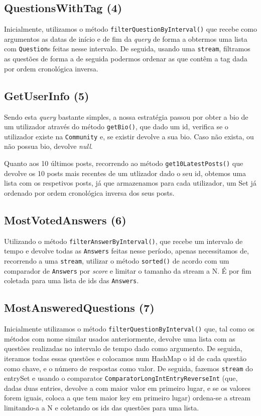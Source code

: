 \documentclass[a4paper]{article}
\begin{document}
	\subsection{QuestionsWithTag (4)}
		\tab Inicialmente, utilizamos o método \texttt{filterQuestionByInterval()} que recebe
		como argumentos as datas de início e de fim da \textit{query} de forma a obtermos
		uma lista com \texttt{Question}s feitas nesse intervalo. De seguida, usando uma \texttt{stream},
		filtramos as questões de forma a de seguida podermos ordenar as que contêm a tag dada
		por ordem cronológica inversa.

	\subsection{GetUserInfo (5)}
		\tab Sendo esta \textit{query} bastante simples, a nossa estratégia passou por
		obter a bio de um utilizador através do método \texttt{getBio()}, que dado um id,
		verifica se o utilizador existe na \texttt{Community} e, se existir devolve a sua bio.
		Caso não exista, ou não possua bio, devolve \textit{null}.
		\par Quanto aos 10 últimos posts, recorrendo ao método \texttt{get10LatestPosts()} que devolve
		os 10 posts mais recentes de um utlizador dado o seu id, obtemos uma lista com os respetivos posts, já que
		armazenamos para cada utilizador, um Set já ordenado por ordem cronológica inversa dos seus
		posts.

	\subsection{MostVotedAnswers (6)}
		\tab Utilizando o método \texttt{filterAnswerByInterval()}, que recebe um intervalo
		de tempo e devolve todas as \texttt{Answers} feitas nesse período, apenas necessitamos
		de, recorrendo a uma \texttt{stream}, utilizar o método \texttt{sorted()} de acordo
		com um comparador de \texttt{Answers} por \textit{score} e limitar o tamanho
		da stream a N. É por fim coletada para uma lista de ids das \texttt{Answers}.

	\subsection{MostAnsweredQuestions (7)}
		\tab Inicialmente utilizamos o método \texttt{filterQuestionByInterval()} que, tal como
		os métodos com nome similar usados anteriormente, devolve uma lista com as questões
		realizadas no intervalo de tempo dado como argumento.
		De seguida, iteramos todas essas questões e colocamos num HashMap o id de cada questão
		como chave, e o número de respostas como valor. De seguida, fazemos \texttt{stream}
		do entrySet e usando o comparator \texttt{ComparatorLongIntEntryReverseInt} (que, dadas
		duas entries, devolve a com maior valor em primeiro lugar, e se os valores forem iguais, coloca
		a que tem maior key em primeiro lugar) ordena-se a stream limitando-a a N e coletando
		os ids das questões para uma lista.
\end{document}
